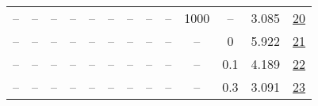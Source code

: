 \begin{table}[H]
\begin{tabular}{ccccccccccccc}
-- & -- & -- & -- & -- & -- & -- & -- & -- & 1000 & -- & 3.085 & \href{https://wandb.ai/stanford-mercury/optimizer-scaling/runs/sweep-520m-10B-mudamnd73fc9lr0.004-alr0.004-wd0.2-minlr0-warmup1-d220d1}{20} \\
-- & -- & -- & -- & -- & -- & -- & -- & -- & -- & 0 & 5.922 & \href{https://wandb.ai/stanford-mercury/optimizer-scaling/runs/sweep-520m-10B-mudamv6f35b2lr0.004-alr0.004-wd0-minlr0-warmup500-a689b1}{21} \\
-- & -- & -- & -- & -- & -- & -- & -- & -- & -- & 0.1 & 4.189 & \href{https://wandb.ai/stanford-mercury/optimizer-scaling/runs/sweep-520m-10B-mudamvfa96e0lr0.004-alr0.004-wd0.1-minlr0-warmup5-dbdb77}{22} \\
-- & -- & -- & -- & -- & -- & -- & -- & -- & -- & 0.3 & 3.091 & \href{https://wandb.ai/stanford-mercury/optimizer-scaling/runs/sweep-520m-10B-mudamv5683a2lr0.004-alr0.004-wd0.3-minlr0-warmup5-797b29}{23} \\
\bottomrule
\end{tabular}
\end{table}


